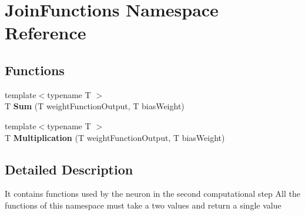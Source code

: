 \hypertarget{namespace_join_functions}{\section{Join\-Functions Namespace Reference}
\label{namespace_join_functions}
}
\subsection*{Functions}
\begin{DoxyCompactItemize}
\item 
\hypertarget{namespace_join_functions_af7f0bc7c05299b54626b9f0b74c4994e}{{\footnotesize template$<$typename T $>$ }\\T {\bfseries Sum} (T weight\-Function\-Output, T bias\-Weight)}\label{namespace_join_functions_af7f0bc7c05299b54626b9f0b74c4994e}

\item 
\hypertarget{namespace_join_functions_a9facf517c0eb381959f9ae2b8d41aab4}{{\footnotesize template$<$typename T $>$ }\\T {\bfseries Multiplication} (T weight\-Function\-Output, T bias\-Weight)}\label{namespace_join_functions_a9facf517c0eb381959f9ae2b8d41aab4}

\end{DoxyCompactItemize}


\subsection{Detailed Description}
It contains functions used by the neuron in the second computational step All the functions of this namespace must take a two values and return a single value 